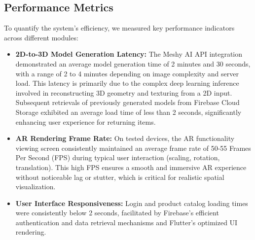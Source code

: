 \documentclass[12pt, a4paper]{article}
\begin{document}
\subsection{Performance Metrics}
To quantify the system's efficiency, we measured key performance indicators across different modules:
\begin{itemize}
    \item \textbf{2D-to-3D Model Generation Latency:} The Meshy AI API integration demonstrated an average model generation time of 2 minutes and 30 seconds, with a range of 2 to 4 minutes depending on image complexity and server load. This latency is primarily due to the complex deep learning inference involved in reconstructing 3D geometry and texturing from a 2D input. Subsequent retrievals of previously generated models from Firebase Cloud Storage exhibited an average load time of less than 2 seconds, significantly enhancing user experience for returning items.
    \item \textbf{AR Rendering Frame Rate:} On tested devices, the AR functionality viewing screen consistently maintained an average frame rate of 50-55 Frames Per Second (FPS) during typical user interaction (scaling, rotation, translation). This high FPS ensures a smooth and immersive AR experience without noticeable lag or stutter, which is critical for realistic spatial visualization.
    \item \textbf{User Interface Responsiveness:} Login and product catalog loading times were consistently below 2 seconds, facilitated by Firebase's efficient authentication and data retrieval mechanisms and Flutter's optimized UI rendering.
\end{itemize}
\end{document}
